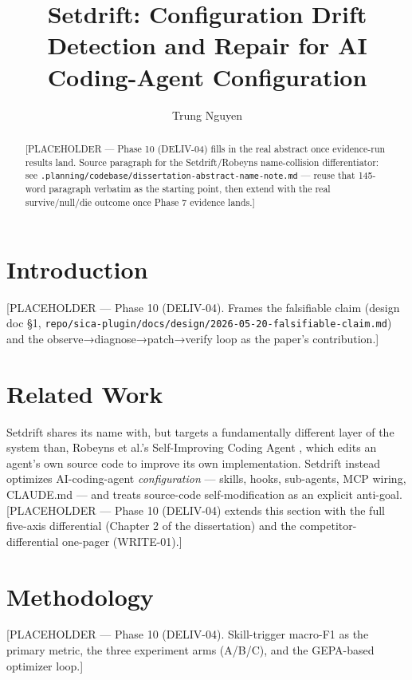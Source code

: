 \documentclass[sigconf]{acmart}
\begin{document}
\title{Setdrift: Configuration Drift Detection and Repair for AI Coding-Agent Configuration}

\author{Trung Nguyen}

\begin{abstract}
[PLACEHOLDER — Phase 10 (DELIV-04) fills in the real abstract once
evidence-run results land. Source paragraph for the Setdrift/Robeyns
name-collision differentiator: see
\texttt{.planning/codebase/dissertation-abstract-name-note.md} — reuse that
145-word paragraph verbatim as the starting point, then extend with the
real survive/null/die outcome once Phase 7 evidence lands.]
\end{abstract}

\maketitle

\section{Introduction}
[PLACEHOLDER — Phase 10 (DELIV-04). Frames the falsifiable claim (design doc
\S1, \texttt{repo/sica-plugin/docs/design/2026-05-20-falsifiable-claim.md})
and the observe→diagnose→patch→verify loop as the paper's contribution.]

\section{Related Work}
Setdrift shares its name with, but targets a fundamentally different layer of
the system than, Robeyns et al.'s Self-Improving Coding Agent
\cite{robeyns2025selfimproving}, which edits an agent's own source code to
improve its own implementation. Setdrift instead optimizes AI-coding-agent
\emph{configuration} — skills, hooks, sub-agents, MCP wiring, CLAUDE.md — and
treats source-code self-modification as an explicit anti-goal. [PLACEHOLDER —
Phase 10 (DELIV-04) extends this section with the full five-axis
differential (Chapter 2 of the dissertation) and the competitor-differential
one-pager (WRITE-01).]

\section{Methodology}
[PLACEHOLDER — Phase 10 (DELIV-04). Skill-trigger macro-F1 as the primary
metric, the three experiment arms (A/B/C), and the GEPA-based optimizer loop.]
\end{document}
